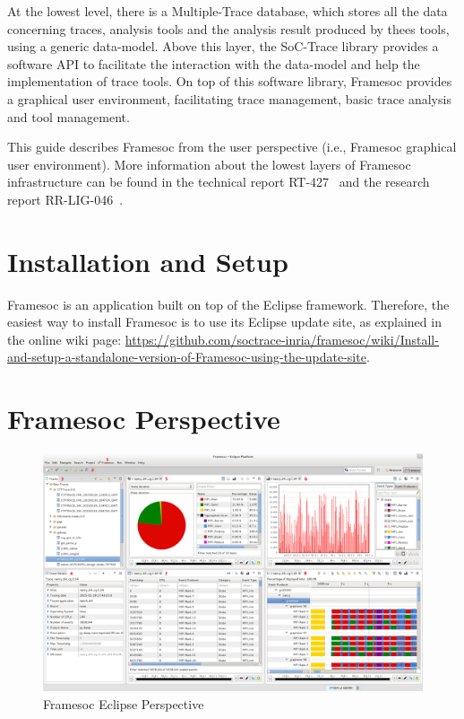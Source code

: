 \documentclass[twoside]{article}
\begin{document}
\begin{sloppypar}
At the lowest level, there is a Multiple-Trace database, which stores all the data concerning traces, analysis tools and the analysis result produced by thees tools, using a generic data-model.
Above this layer, the SoC-Trace library provides a software API to facilitate the interaction with the data-model and help the implementation of trace tools.
On top of this software library, Framesoc provides a graphical user environment, facilitating trace management, basic trace analysis and tool management.

This guide describes Framesoc from the user perspective (i.e., Framesoc graphical user environment). 
More information about the lowest layers of Framesoc infrastructure can be found in the technical report RT-427~\cite{pagano:hal} and the research report RR-LIG-046~\cite{rrlig46}.

\newpage

\section{Installation and Setup}
\label{sec:installation}

Framesoc is an application built on top of the Eclipse framework. Therefore, the easiest way to install Framesoc is to use its Eclipse update site, as explained in the online wiki page: \url{https://github.com/soctrace-inria/framesoc/wiki/Install-and-setup-a-standalone-version-of-Framesoc-using-the-update-site}.

\section{Framesoc Perspective}
\label{sec:perspective}

\begin{figure}[h!]
  \centering
    \includegraphics[width=1.0\textwidth]{images/perspective_numbers.png}
  \caption{Framesoc Eclipse Perspective}
  \label{fig:all_perspective}
\end{figure}


\end{sloppypar}
\end{document}
